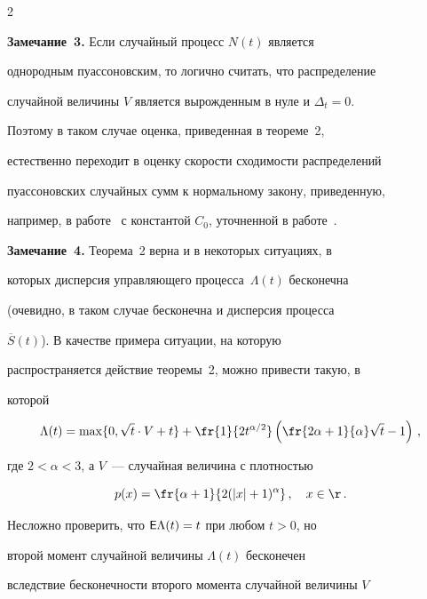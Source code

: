 \begin{multicols}{2}
\noindent


\textbf{Замечание~3.} Если случайный процесс $N(t)$ является


однородным пуассоновским, то логично считать, что распределение


случайной величины $V$ является вырожденным в нуле и $\Delta_t=0$.


Поэтому в таком случае оценка, приведенная в теореме~2,


естественно переходит в оценку скорости схо\-ди\-мости распределений


пуассоновских случайных сумм к нормальному закону, приведенную,


например, в работе~\cite{7a} с константой $C_0$, уточненной в работе~\cite{8a}.


{





}





\medskip





\noindent


\textbf{Замечание~4.} Теорема~2 верна и в некоторых ситуациях, в


которых дисперсия управляющего процесса~$\Lambda(t)$ бесконечна


(очевидно, в таком случае бесконечна и дисперсия процесса


$\overline S(t)$). В качестве примера ситуации, на которую


распространяется действие теоремы~2, можно привести такую, в


которой


$$


\Lambda(t)=\max\{0,\sqrt{t}\cdot V+t\}+\fr{1}{2t^{\alpha/2}}\left(\fr{2\alpha+1}{\alpha}\sqrt{t}-1\right )\,,


$$


где $2<\alpha<3$, а $V$~--- случайная величина с плот\-ностью


$$


p(x)=\fr{\alpha+1}{2(|x|+1)^{\alpha}}\,,\quad x\in\r\,.


$$


Несложно проверить, что ${\sf E}\Lambda(t)=t$ при любом $t>0$, но


второй момент случайной величины $\Lambda(t)$ бесконечен


вследствие бесконечности второго момента случайной величины $V$



\end{multicols}

